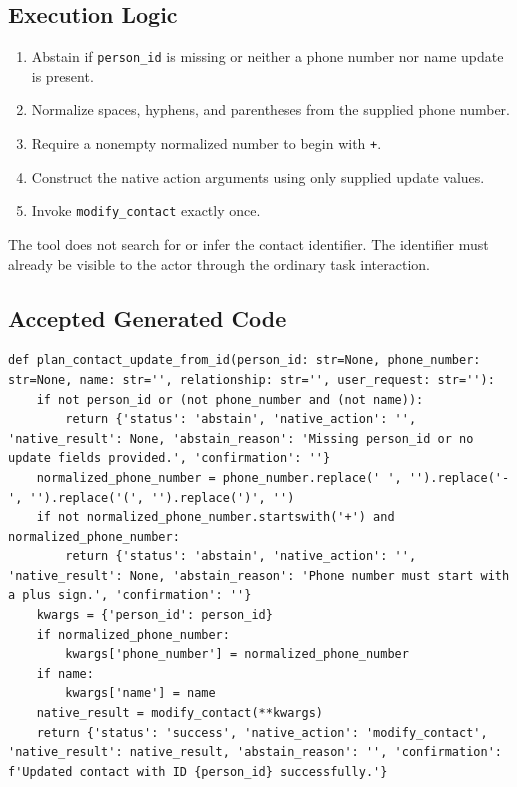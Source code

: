 \subsection{Execution Logic}\label{execution-logic-5}

\begin{enumerate}
\def\labelenumi{\arabic{enumi}.}
\tightlist
\item
  Abstain if \texttt{person\_id} is missing or neither a phone number
  nor name update is present.
\item
  Normalize spaces, hyphens, and parentheses from the supplied phone
  number.
\item
  Require a nonempty normalized number to begin with \texttt{+}.
\item
  Construct the native action arguments using only supplied update
  values.
\item
  Invoke \texttt{modify\_contact} exactly once.
\end{enumerate}

The tool does not search for or infer the contact identifier. The
identifier must already be visible to the actor through the ordinary
task interaction.

\subsection{Accepted Generated Code}\label{accepted-generated-code-5}

\begin{lstlisting}[style=sagepython,caption={Accepted direct-contact-update native-action tool.},label={lst:sage-contact-update-id}]
def plan_contact_update_from_id(person_id: str=None, phone_number: str=None, name: str='', relationship: str='', user_request: str=''):
    if not person_id or (not phone_number and (not name)):
        return {'status': 'abstain', 'native_action': '', 'native_result': None, 'abstain_reason': 'Missing person_id or no update fields provided.', 'confirmation': ''}
    normalized_phone_number = phone_number.replace(' ', '').replace('-', '').replace('(', '').replace(')', '')
    if not normalized_phone_number.startswith('+') and normalized_phone_number:
        return {'status': 'abstain', 'native_action': '', 'native_result': None, 'abstain_reason': 'Phone number must start with a plus sign.', 'confirmation': ''}
    kwargs = {'person_id': person_id}
    if normalized_phone_number:
        kwargs['phone_number'] = normalized_phone_number
    if name:
        kwargs['name'] = name
    native_result = modify_contact(**kwargs)
    return {'status': 'success', 'native_action': 'modify_contact', 'native_result': native_result, 'abstain_reason': '', 'confirmation': f'Updated contact with ID {person_id} successfully.'}
\end{lstlisting}

